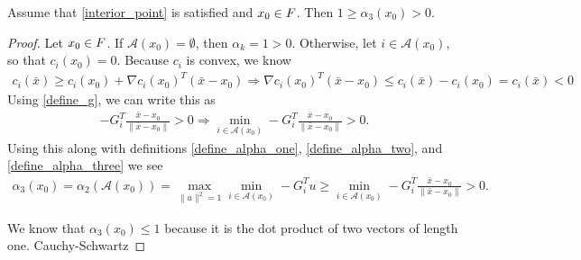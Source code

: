 \begin{lemma}
\label{alphas_are_positive}
Assume that \cref{interior_point} is satisfied and $x_0 \in {F}$.
Then $1 \ge \alpha_3(x_0) > 0$. 
\end{lemma}

\begin{proof}
Let $x_0 \in {F}$.
If $\mathcal A(x_0) = \emptyset$, then $\alpha_k = 1 > 0$.
Otherwise, let $i \in \mathcal A(x_0)$, so that $c_i(x_0) = 0$.
Because $c_i$ is convex, we know
\begin{align*}
c_i(\bar x) \ge c_i(x_0) + \nabla c_i(x_0)^T(\bar x - x_0)
\Longrightarrow \nabla c_i(x_0)^T(\bar x - x_0) \le c_i(\bar x) - c_i(x_0) = c_i(\bar x) < 0
\end{align*}
Using \cref{define_g}, we can write this as
\begin{align*}
-G^T_i\frac {\bar x - x_0}{\|\bar x - x_0\|} > 0  \Longrightarrow \min_{i \in \mathcal A(x_0)} -G_i^T\frac {\bar x - x_0}{\|\bar x - x_0\|} > 0.
\end{align*}
Using this along with definitions \cref{define_alpha_one}, \cref{define_alpha_two}, and \cref{define_alpha_three} we see
\begin{align*}
\alpha_3(x_0) = \alpha_2\left(\mathcal A(x_0)\right) = \max_{\|u\|^2 = 1} \min_{i \in \mathcal A(x_0)} -G_i^Tu
\ge \min_{i \in \mathcal A(x_0)} - G_i^T\frac {\bar x - x_0}{\|\bar x - x_0\|} > 0.
\end{align*}

We know that $\alpha_3(x_0) \le 1$ because it is the dot product of two vectors of length one.
\color{red}
Cauchy-Schwartz
\color{black}

\end{proof}

